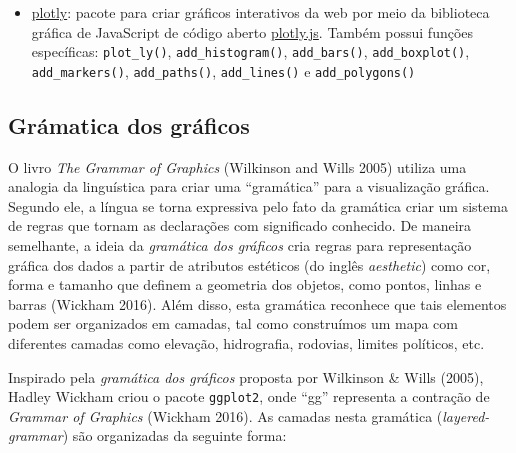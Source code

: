 \documentclass[
]{article}
\begin{document}
\begin{itemize}
\item
  \href{https://plotly.com/r/}{plotly}: pacote para criar gráficos interativos da web por meio da biblioteca gráfica de JavaScript de código aberto \href{https://plotly.com/}{plotly.js}. Também possui funções específicas: \texttt{plot\_ly()}, \texttt{add\_histogram()}, \texttt{add\_bars()}, \texttt{add\_boxplot()}, \texttt{add\_markers()}, \texttt{add\_paths()}, \texttt{add\_lines()} e \texttt{add\_polygons()}
\end{itemize}

\hypertarget{gruxe1matica-dos-gruxe1ficos}{%
\subsection{Grámatica dos gráficos}\label{gruxe1matica-dos-gruxe1ficos}}

O livro \emph{The Grammar of Graphics} (Wilkinson and Wills 2005) utiliza uma analogia da linguística para criar uma ``gramática'' para a visualização gráfica. Segundo ele, a língua se torna expressiva pelo fato da gramática criar um sistema de regras que tornam as declarações com significado conhecido. De maneira semelhante, a ideia da \emph{gramática dos gráficos} cria regras para representação gráfica dos dados a partir de atributos estéticos (do inglês \emph{aesthetic}) como cor, forma e tamanho que definem a geometria dos objetos, como pontos, linhas e barras (Wickham 2016). Além disso, esta gramática reconhece que tais elementos podem ser organizados em camadas, tal como construímos um mapa com diferentes camadas como elevação, hidrografia, rodovias, limites políticos, etc.

Inspirado pela \emph{gramática dos gráficos} proposta por Wilkinson \& Wills (2005), Hadley Wickham criou o pacote \texttt{ggplot2}, onde ``gg'' representa a contração de \emph{Grammar of Graphics} (Wickham 2016). As camadas nesta gramática (\emph{layered-grammar}) são organizadas da seguinte forma:
\end{document}
